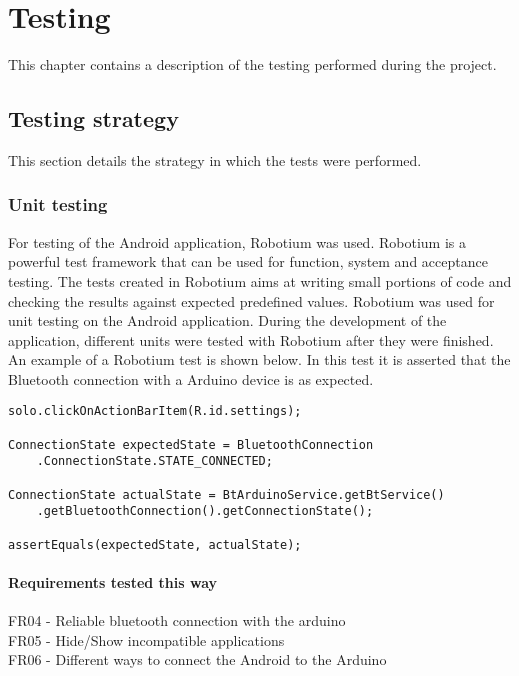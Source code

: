 \chapter{Testing}
	This chapter contains a description of the testing performed during the project. 
	
	\section{Testing strategy}
		This section details the strategy in which the tests were performed.
		\subsection{Unit testing}
			For testing of the Android application, Robotium was used. Robotium is a powerful test framework that can be used for function, system and acceptance testing. The tests created in Robotium aims at writing small portions of code and checking the results against expected predefined values. Robotium was used for unit testing on the Android application. During the development of the application, different units were tested with Robotium after they were finished. An example of a Robotium test is shown below. In this test it is asserted that the Bluetooth connection with a Arduino device is as expected. \\

			\begin{lstlisting}
solo.clickOnActionBarItem(R.id.settings);

ConnectionState expectedState = BluetoothConnection
	.ConnectionState.STATE_CONNECTED;
	
ConnectionState actualState = BtArduinoService.getBtService()
	.getBluetoothConnection().getConnectionState();

assertEquals(expectedState, actualState);
			\end{lstlisting}

			\subsubsection{Requirements tested this way}
			FR04 - Reliable bluetooth connection with the arduino\\
			FR05 - Hide/Show incompatible applications\\
			FR06 - Different ways to connect the Android to the Arduino\\

